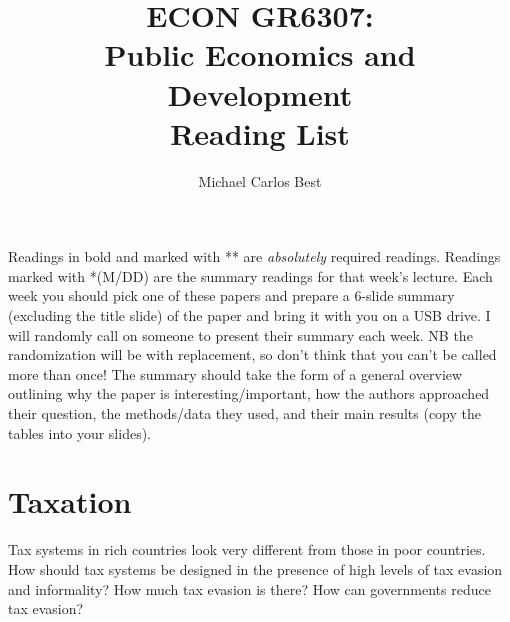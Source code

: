 \documentclass[11pt]{article}
\begin{document}
\title{ECON GR6307: \\ Public Economics and Development \\ Reading List}
\author{Michael Carlos Best}

\maketitle

Readings in bold and marked with ** are \textit{absolutely} required readings. Readings marked with *(M/DD) are the summary readings for that week's lecture. Each week you should pick one of these papers and prepare a 6-slide summary (excluding the title slide) of the paper and bring it with you on a USB drive. I will randomly call on someone to present their summary each week. NB the randomization will be with replacement, so don't think that you can't be called more than once! The summary should take the form of a general overview outlining why the paper is interesting/important, how the authors approached their question, the methods/data they used, and their main results (copy the tables into your slides).

\section{Taxation}
Tax systems in rich countries look very different from those in poor countries. How should tax systems be designed in the presence of high levels of tax evasion and informality? How much tax evasion is there? How can governments reduce tax evasion?
\end{document}
